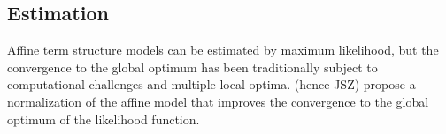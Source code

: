 {%
%	
%	
%	


%


\subsection{Estimation} \label{sec:Estimation}
\iftoggle{toclinks}{\gototoc}{} %
Affine term structure models can be estimated by maximum likelihood, but the convergence to the global optimum has been traditionally subject to computational challenges and multiple local optima.
\citet*{JSZ:2011} (hence JSZ) propose a normalization of the affine model that improves the convergence to the global optimum of the likelihood function.

}
